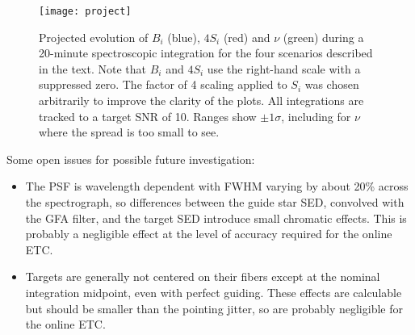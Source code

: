 \documentclass[11pt]{article}
\begin{document}
\begin{figure}[htb]
\begin{center}
\texttt{[image: project]}
\caption{Projected evolution of $B_i$ (blue), $4 S_i$ (red) and $\nu$ (green) during a 20-minute spectroscopic integration for the four scenarios described in the text. Note that $B_i$ and $4 S_i$ use the right-hand scale with a suppressed zero.  The factor of 4 scaling applied to $S_i$ was chosen arbitrarily to improve the clarity of the plots. All integrations are tracked to a target SNR of 10. Ranges show $\pm 1\sigma$, including for $\nu$ where the spread is too small to see.}
\label{fig:project}
\end{center}
\end{figure}

Some open issues for possible future investigation:
\begin{itemize}
\item The PSF is wavelength dependent with FWHM varying by about 20\% across the spectrograph, so differences between the guide star SED, convolved with the GFA filter, and the target SED introduce small chromatic effects. This is probably a negligible effect at the level of accuracy required for the online ETC.
\item Targets are generally not centered on their fibers except at the nominal integration midpoint, even with perfect guiding. These effects are calculable but should be smaller than the pointing jitter, so are probably negligible for the online ETC.
\end{itemize}
\end{document}
